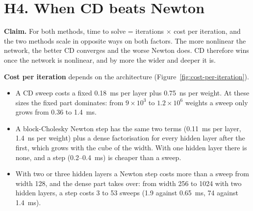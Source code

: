 \documentclass[11pt,a4paper]{article}
\newcommand{\claim}[1]{\par\noindent\textbf{Claim.} #1\par}
\begin{document}
\section*{H4. When CD beats Newton}


\claim{For both methods, time to solve = iterations $\times$ cost per
iteration, and the two methods scale in opposite ways on both factors. The
more nonlinear the network, the better CD converges and the worse Newton
does. CD therefore wins once the network is nonlinear, and by more the
wider and deeper it is.}

\textbf{Cost per iteration} depends on the architecture
(Figure~\ref{fig:cost-per-iteration}).
\begin{itemize}
\item A CD sweep costs a fixed 0.18~ms per layer plus 0.75~ns per weight.
At these sizes the fixed part dominates: from $9\times10^3$ to
$1.2\times10^6$ weights a sweep only grows from 0.36 to 1.4~ms.
\item A block-Cholesky Newton step has the same two terms (0.11~ms per
layer, 1.4~ns per weight) plus a dense factorisation for every hidden
layer after the first, which grows with the cube of the width. With one
hidden layer there is none, and a step (0.2--0.4~ms) is cheaper than a
sweep.
\item With two or three hidden layers a Newton step costs more than a
sweep from width 128, and the dense part takes over: from width 256 to
1024 with two hidden layers, a step costs 3 to 53 sweeps (1.9 against
0.65~ms, 74 against 1.4~ms).
\end{itemize}
\end{document}
